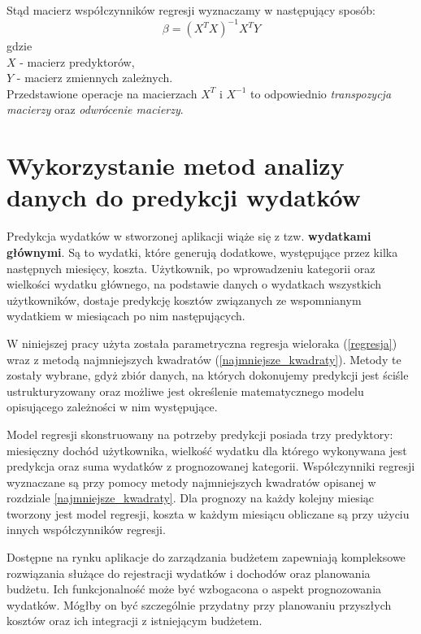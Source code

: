 Stąd macierz współczynników regresji wyznaczamy w następujący sposób:
\[\beta = (X^TX)^{-1}X^TY\]
gdzie\\
\(X\) - macierz predyktorów,\\
\(Y\) - macierz zmiennych zależnych.\cite{martinabremer2012}\\
Przedstawione operacje na macierzach \(X^T\) i \(X^{-1}\) to odpowiednio \textit{transpozycja macierzy} oraz \textit{odwrócenie macierzy}.

\section{Wykorzystanie metod analizy danych do predykcji wydatków}
Predykcja wydatków w stworzonej aplikacji wiąże się z tzw. \textbf{wydatkami głównymi}. Są to wydatki, które generują dodatkowe, występujące przez kilka następnych miesięcy, koszta. Użytkownik, po wprowadzeniu kategorii oraz wielkości wydatku głównego, na podstawie danych o wydatkach wszystkich użytkowników, dostaje predykcję kosztów związanych ze wspomnianym wydatkiem w miesiącach po nim następujących.

W niniejszej pracy użyta została parametryczna regresja wieloraka (\ref{regresja}) wraz z metodą najmniejszych kwadratów (\ref{najmniejsze_kwadraty}). Metody te zostały wybrane, gdyż zbiór danych, na których dokonujemy predykcji jest ściśle ustrukturyzowany oraz możliwe jest określenie matematycznego modelu opisującego zależności w nim występujące.

Model regresji skonstruowany na potrzeby predykcji posiada trzy predyktory: miesięczny dochód użytkownika, wielkość wydatku dla którego wykonywana jest predykcja oraz suma wydatków z prognozowanej kategorii. Współczynniki regresji wyznaczane są przy pomocy metody najmniejszych kwadratów opisanej w rozdziale \ref{najmniejsze_kwadraty}. Dla prognozy na każdy kolejny miesiąc tworzony jest model regresji, koszta w każdym miesiącu obliczane są przy użyciu innych współczynników regresji.

Dostępne na rynku aplikacje do zarządzania budżetem zapewniają kompleksowe rozwiązania służące do rejestracji wydatków i dochodów oraz planowania budżetu. Ich funkcjonalność może być wzbogacona o aspekt prognozowania wydatków. Mógłby on być szczególnie przydatny przy planowaniu przyszłych kosztów oraz ich integracji z istniejącym budżetem.